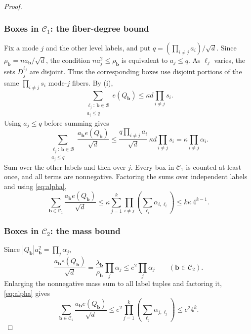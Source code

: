 \documentclass[10pt,a4paper]{amsart}
\numberwithin{equation}{section}
\begin{document}
\begin{proof}
\subsubsection*{Boxes in $\mathcal C_1$: the fiber-degree bound}
Fix a mode $j$ and the other level labels, and put
$q=(\prod_{i\ne j}a_i)/\sqrt d$. Since
$\rho_{\mathbf b}=na_{\mathbf b}/\sqrt d$, the condition
$na_j^2\le\rho_{\mathbf b}$ is equivalent to $a_j\le q$.
As $\ell_j$ varies, the sets $D_j^{\ell_j}$ are disjoint.
Thus the corresponding boxes use disjoint portions of the same
$\prod_{i\ne j}s_i$ mode-$j$ fibers. By \textup{(i)},
\[
 \sum_{\substack{\ell_j:\ \mathbf b\in\mathcal B\\a_j\le q}}e(Q_{\mathbf b})
 \le\kappa d\prod_{i\ne j}s_i.
\]
Using $a_j\le q$ before summing gives
\[
 \sum_{\substack{\ell_j:\ \mathbf b\in\mathcal B\\a_j\le q}}
       \frac{a_{\mathbf b}e(Q_{\mathbf b})}{\sqrt d}
 \le\frac{q\prod_{i\ne j}a_i}{\sqrt d}\,
       \kappa d\prod_{i\ne j}s_i
 =\kappa\prod_{i\ne j}\alpha_i.
\]
Sum over the other labels and then over $j$. Every box in
$\mathcal C_1$ is counted at least once, and all terms are nonnegative.
Factoring the sums over independent labels and using \eqref{eq:alpha},
\begin{equation}\label{eq:unbalanced-sum}
 \sum_{\mathbf b\in\mathcal C_1}
       \frac{a_{\mathbf b}e(Q_{\mathbf b})}{\sqrt d}
 \le\kappa\sum_{j=1}^k
       \prod_{i\ne j}\left(\sum_{\ell_i}\alpha_{i,\ell_i}\right)
 \le k\kappa\,4^{k-1}.
\end{equation}

\subsubsection*{Boxes in $\mathcal C_2$: the mass bound}
Since $|Q_{\mathbf b}|a_{\mathbf b}^2=\prod_j\alpha_j$,
\[
 \frac{a_{\mathbf b}e(Q_{\mathbf b})}{\sqrt d}
 =\frac{\lambda_{\mathbf b}}{\rho_{\mathbf b}}\prod_j\alpha_j
 \le e^2\prod_j\alpha_j
 \qquad(\mathbf b\in\mathcal C_2).
\]
Enlarging the nonnegative mass sum to all label tuples and factoring
it, \eqref{eq:alpha} gives
\begin{equation}\label{eq:moderate-sum}
 \sum_{\mathbf b\in\mathcal C_2}
       \frac{a_{\mathbf b}e(Q_{\mathbf b})}{\sqrt d}
 \le e^2\prod_{j=1}^k\left(\sum_{\ell_j}\alpha_{j,\ell_j}\right)
 \le e^2 4^k.
\end{equation}


\end{proof}
\end{document}
